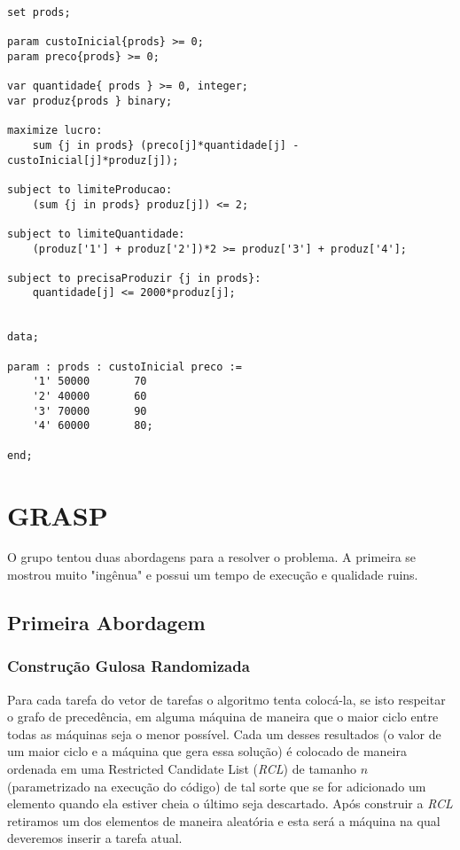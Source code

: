 \documentclass{report}
\begin{document}
\begin{lstlisting}
set prods;

param custoInicial{prods} >= 0;
param preco{prods} >= 0;

var quantidade{ prods } >= 0, integer;
var produz{prods } binary;

maximize lucro:
	sum {j in prods} (preco[j]*quantidade[j] - custoInicial[j]*produz[j]);

subject to limiteProducao:
	(sum {j in prods} produz[j]) <= 2;

subject to limiteQuantidade:
	(produz['1'] + produz['2'])*2 >= produz['3'] + produz['4'];

subject to precisaProduzir {j in prods}:
	quantidade[j] <= 2000*produz[j];


data;

param : prods : custoInicial preco :=
	'1'	50000		70
	'2'	40000		60
	'3'	70000		90
	'4'	60000		80;

end;
\end{lstlisting}

\chapter{GRASP}

O grupo tentou duas abordagens para a resolver o problema. A primeira se
mostrou muito "ingênua" e possui um tempo de execução e qualidade ruins.

\section{Primeira Abordagem}

\subsection{Construção Gulosa Randomizada}

Para cada tarefa do vetor de tarefas o algoritmo tenta colocá-la, se
isto respeitar o grafo de precedência, em alguma
máquina de maneira que o maior ciclo entre todas as máquinas
seja o menor possível. Cada um desses resultados (o valor de um maior ciclo e
a máquina que gera essa solução)
é colocado de maneira ordenada em uma Restricted Candidate List (\emph{RCL})
de tamanho $n$ (parametrizado na execução do código)
de tal sorte que se for adicionado um elemento quando ela estiver
cheia o último seja descartado. Após construir a \emph{RCL} retiramos um dos
elementos de maneira aleatória e esta será a máquina na qual deveremos inserir
a tarefa atual.
\end{document}
